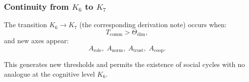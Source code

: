 \subsubsection{Continuity from \texorpdfstring{$K_6$}{K_6} to \texorpdfstring{$K_7$}{K_7}}

The transition $K_6\to K_7$ (the corresponding derivation note) occurs when:
\[
  T_{\mathrm{comm}} > \Theta_{\mathrm{dim}},
\]
and new axes appear:
\[
  A_{\mathrm{role}},\;
  A_{\mathrm{norm}},\;
  A_{\mathrm{trust}},\;
  A_{\mathrm{coop}}.
\]

This generates new thresholds and permits the existence of social cycles
with no analogue at the cognitive level $K_6$.
